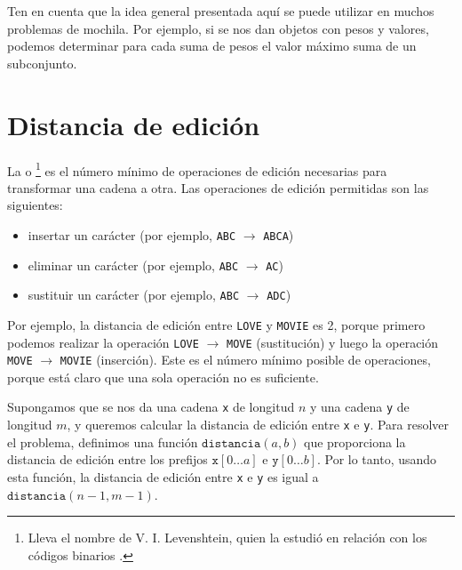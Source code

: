 Ten en cuenta que la idea general presentada aquí se puede utilizar
en muchos problemas de mochila.
Por ejemplo, si se nos dan objetos con pesos y valores,
podemos determinar para cada suma de pesos el valor máximo
suma de un subconjunto.

\section{Distancia de edición}


La  o \footnote{
    Lleva el nombre de V. I. Levenshtein, quien la estudió en relación
    con los códigos binarios \cite{lev66}.} es el número mínimo de
operaciones de edición necesarias para transformar una cadena a otra.
Las operaciones de edición permitidas son las siguientes:
\begin{itemize}
    \item insertar un carácter (por ejemplo, \texttt{ABC} $\rightarrow$ \texttt{ABCA})
    \item eliminar un carácter (por ejemplo, \texttt{ABC} $\rightarrow$ \texttt{AC})
    \item sustituir un carácter (por ejemplo, \texttt{ABC} $\rightarrow$ \texttt{ADC})
\end{itemize}

Por ejemplo, la distancia de edición entre
\texttt{LOVE} y \texttt{MOVIE} es 2,
porque primero podemos realizar la operación
\texttt{LOVE} $\rightarrow$ \texttt{MOVE}
(sustitución) y luego la operación
\texttt{MOVE} $\rightarrow$ \texttt{MOVIE}
(inserción).
Este es el número mínimo posible de operaciones,
porque está claro que una sola operación no es suficiente.

Supongamos que se nos da una cadena \texttt{x}
de longitud $n$ y una cadena \texttt{y} de longitud $m$,
y queremos calcular la distancia de edición entre
\texttt{x} e \texttt{y}.
Para resolver el problema, definimos una función
$\texttt{distancia}(a,b)$ que proporciona la
distancia de edición entre los prefijos
$\texttt{x}[0 \ldots a]$ e $\texttt{y}[0 \ldots b]$.
Por lo tanto, usando esta función, la distancia de edición
entre \texttt{x} e \texttt{y} es igual a $\texttt{distancia}(n-1,m-1)$.

